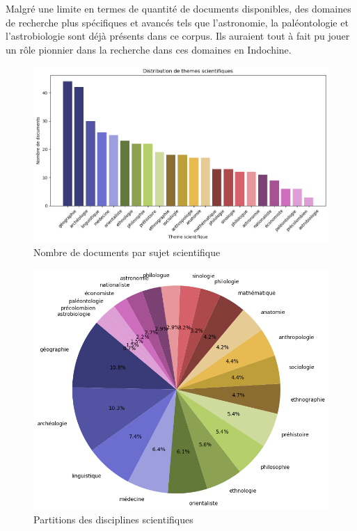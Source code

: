 Malgré une limite en termes de quantité de documents disponibles, des domaines de recherche plus spécifiques et avancés tels que l'astronomie, la paléontologie et l'astrobiologie sont déjà présents dans ce corpus. Ils auraient tout à fait pu jouer un rôle pionnier dans la recherche dans ces domaines en Indochine.

\begin{figure} [H]%
    \centering
    \includegraphics[width=14cm]{img/theme_nbdoc_scientifique_0.2.png}
    \caption{Nombre de documents par sujet scientifique}
    \label{fig:theme_nbdoc_scientifique}
\end{figure}



\begin{figure} [t]%
    \centering
    \includegraphics[width=14cm]{img/circle_topic.png}
    \caption{ Partitions des disciplines scientifiques}
    \label{fig:circle_topic}
\end{figure}

